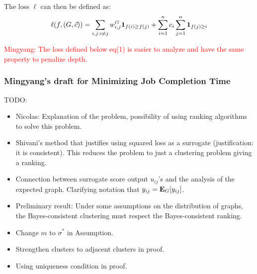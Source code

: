 The loss $\ell$ can then be defined as:
\begin{align*}
  \ell(f, (G, \vec{c}))
  = \sum_{i,j: i \neq j} w_{i,j}^G {\mathbf 1}_{f(i) \geq f(j)}
  + \sum_{i=1}^n c_i \sum_{j=1}^n {\mathbf 1}_{f(j) \geq i}
\end{align*}

\textcolor{red}{Mingyang: The loss defined below eq(1) is easier to analyze and have the same property to penalize depth.}


\subsubsection{Mingyang's draft for Minimizing Job Completion Time}

TODO:
\begin{itemize}
\item Nicolas: Explanation of the problem, possibility of using ranking
  algorithms to solve this problem. 
\item Shivani's method that justifies using squared loss as a surrogate
  (justification: it is consistent). This reduces the problem to just a
  clustering problem giving a ranking.
\item Connection between surrogate score output $u_{ij}$'s and the analysis
  of the expected graph. Clarifying notation that $y_{ij} = {\mathbf E}_G[y_{ij}]$.
\item Preliminary result: Under some assumptions on the distribution of graphs,
  the Bayes-consistent clustering must respect the Bayes-consistent ranking.
\item Change $m$ to $\sigma^*$ in Assumption.
\item Strengthen clusters to adjacent clusters in proof. 
\item Using uniqueness condition in proof. 
\end{itemize}

